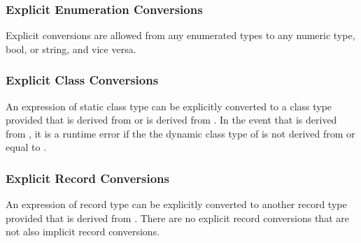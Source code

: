 \subsubsection{Explicit Enumeration Conversions}
\label{Explicit_Enumeration_Conversions}

Explicit conversions are allowed from any enumerated types to any
numeric type, bool, or string, and vice versa.

\subsubsection{Explicit Class Conversions}
\label{Explicit_Class_Conversions}

An expression of static class type  can be explicitly
converted to a class type  provided that  is derived
from  or  is derived from .  In the event
that  is derived from , it is a runtime error if the
the dynamic class type of  is not derived from or equal
to .

\subsubsection{Explicit Record Conversions}
\label{Explicit_Record_Conversions}

An expression of record type  can be explicitly converted to
another record type  provided that  is derived
from .  There are no explicit record conversions that are not
also implicit record conversions.
